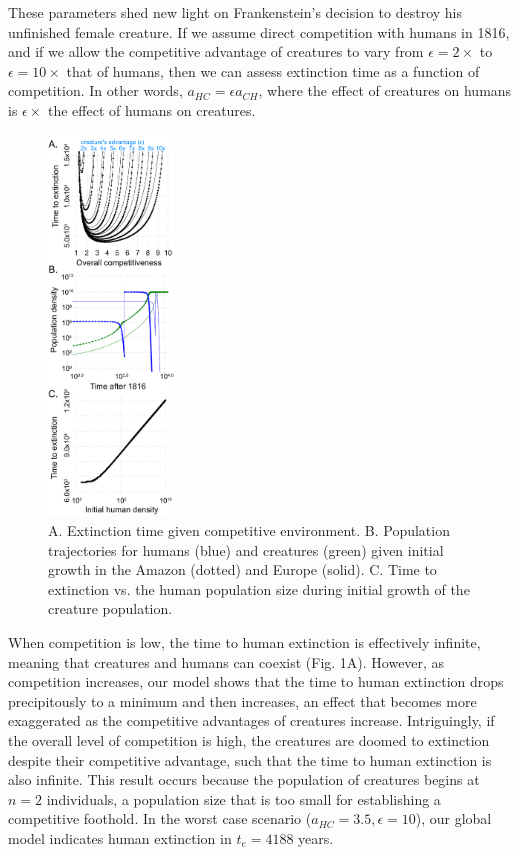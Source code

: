 \documentclass{article}[10pt]
\begin{document}
These parameters shed new light on Frankenstein's decision to destroy his unfinished female creature.
If we assume direct competition with humans in 1816, and if we allow the competitive advantage of creatures to vary from $\epsilon=2\times$ to $\epsilon=10\times$ that of humans, then we can assess extinction time as a function of competition.
In other words, $a_{HC} = \epsilon a_{CH}$, where the effect of creatures on humans is $\epsilon \times$ the effect of humans on creatures.

\begin{figure}
\singlespacing
  \vspace{-35pt}
  \begin{center}
    \includegraphics[width=0.3\textwidth]{fig_combined.pdf}
  \end{center}
  \vspace{-10pt}
  \caption{\footnotesize 
  A. Extinction time given competitive environment.
  B. Population trajectories for humans (blue) and creatures (green) given initial growth in the Amazon (dotted) and Europe (solid).
  C. Time to extinction vs. the human population size during initial growth of the creature population.
  }
  \vspace{2pt}
    \label{fig}
\end{figure}
When competition is low, the time to human extinction is effectively infinite, meaning that creatures and humans can coexist (Fig. 1A).
However, as competition increases, our model shows that the time to human extinction drops precipitously to a minimum and then increases, an effect that becomes more exaggerated as the competitive advantages of creatures increase.
Intriguingly, if the overall level of competition is high, the creatures are doomed to extinction despite their competitive advantage, such that the time to human extinction is also infinite.
This result occurs because the population of creatures begins at $n=2$ individuals, a population size that is too small for establishing a competitive foothold.
In the worst case scenario ($a_{HC}=3.5, \epsilon=10$), our global model indicates human extinction in $t_e = 4188$ years.
\end{document}
